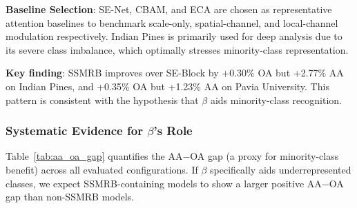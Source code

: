 \documentclass[conference]{IEEEtran}
\begin{document}
{\begin{table}[!t]
\caption{Scale-Only (SE-Net) vs. Affine (SSMRB) Modulation}
\label{tab:senet_comparison}
\centering
{}
\end{table}

\textbf{Baseline Selection}: SE-Net, CBAM, and ECA are chosen as representative attention baselines to benchmark scale-only, spatial-channel, and local-channel modulation respectively. Indian Pines is primarily used for deep analysis due to its severe class imbalance, which optimally stresses minority-class representation.

\textbf{Key finding}: SSMRB improves over SE-Block by +0.30\% OA but +2.77\% AA on Indian Pines, and +0.35\% OA but +1.23\% AA on Pavia University. This pattern is consistent with the hypothesis that $\beta$ aids minority-class recognition.

\subsubsection{Systematic Evidence for $\beta$'s Role}

Table~\ref{tab:aa_oa_gap} quantifies the AA$-$OA gap (a proxy for minority-class benefit) across all evaluated configurations. If $\beta$ specifically aids underrepresented classes, we expect SSMRB-containing models to show a larger positive AA$-$OA gap than non-SSMRB models.

\begin{table}[!t]
\caption{AA$-$OA Gap as Indirect Evidence for $\beta$'s Role}
\label{tab:aa_oa_gap}
\centering
{}
\end{table}

}
\end{document}
